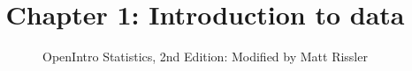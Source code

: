 \documentclass[slidestop,compress,mathserif]{beamer}
\title[Chp 1: Intro. to data]{Chapter 1: Introduction to data}
\author{OpenIntro Statistics, 2nd Edition: Modified by Matt Rissler}
\date{}
\institute{Loras College}
\begin{document}


\begin{frame}[plain]

\titlepage

\end{frame}











\end{document}
